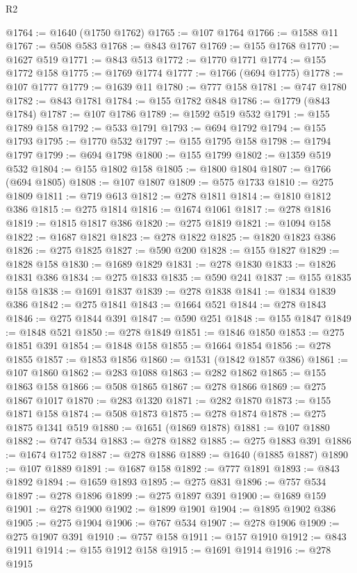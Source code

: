 \begin{lexlean}{R2}
\begin{coremodule}
@1764 := @1640 (@1750 @1762)
@1765 := @107 @1764
@1766 := @1588 @11
@1767 := @508 @583
@1768 := @843 @1767
@1769 := @155 @1768
@1770 := @1627 @519
@1771 := @843 @513
@1772 := @1770 @1771
@1774 := @155 @1772 @158
@1775 := @1769 @1774
@1777 := @1766 (@694 @1775)
@1778 := @107 @1777
@1779 := @1639 @11
@1780 := @777 @158
@1781 := @747 @1780
@1782 := @843 @1781
@1784 := @155 @1782 @848
@1786 := @1779 (@843 @1784)
@1787 := @107 @1786
@1789 := @1592 @519 @532
@1791 := @155 @1789 @158
@1792 := @533 @1791
@1793 := @694 @1792
@1794 := @155 @1793
@1795 := @1770 @532
@1797 := @155 @1795 @158
@1798 := @1794 @1797
@1799 := @694 @1798
@1800 := @155 @1799
@1802 := @1359 @519 @532
@1804 := @155 @1802 @158
@1805 := @1800 @1804
@1807 := @1766 (@694 @1805)
@1808 := @107 @1807
@1809 := @575 @1733
@1810 := @275 @1809
@1811 := @719 @613
@1812 := @278 @1811
@1814 := @1810 @1812 @386
@1815 := @275 @1814
@1816 := @1674 @1061
@1817 := @278 @1816
@1819 := @1815 @1817 @386
@1820 := @275 @1819
@1821 := @1094 @158
@1822 := @1687 @1821
@1823 := @278 @1822
@1825 := @1820 @1823 @386
@1826 := @275 @1825
@1827 := @590 @200
@1828 := @155 @1827
@1829 := @1828 @158
@1830 := @1689 @1829
@1831 := @278 @1830
@1833 := @1826 @1831 @386
@1834 := @275 @1833
@1835 := @590 @241
@1837 := @155 @1835 @158
@1838 := @1691 @1837
@1839 := @278 @1838
@1841 := @1834 @1839 @386
@1842 := @275 @1841
@1843 := @1664 @521
@1844 := @278 @1843
@1846 := @275 @1844 @391
@1847 := @590 @251
@1848 := @155 @1847
@1849 := @1848 @521
@1850 := @278 @1849
@1851 := @1846 @1850
@1853 := @275 @1851 @391
@1854 := @1848 @158
@1855 := @1664 @1854
@1856 := @278 @1855
@1857 := @1853 @1856
@1860 := @1531 (@1842 @1857 @386)
@1861 := @107 @1860
@1862 := @283 @1088
@1863 := @282 @1862
@1865 := @155 @1863 @158
@1866 := @508 @1865
@1867 := @278 @1866
@1869 := @275 @1867 @1017
@1870 := @283 @1320
@1871 := @282 @1870
@1873 := @155 @1871 @158
@1874 := @508 @1873
@1875 := @278 @1874
@1878 := @275 @1875 @1341 @519
@1880 := @1651 (@1869 @1878)
@1881 := @107 @1880
@1882 := @747 @534
@1883 := @278 @1882
@1885 := @275 @1883 @391
@1886 := @1674 @1752
@1887 := @278 @1886
@1889 := @1640 (@1885 @1887)
@1890 := @107 @1889
@1891 := @1687 @158
@1892 := @777 @1891
@1893 := @843 @1892
@1894 := @1659 @1893
@1895 := @275 @831
@1896 := @757 @534
@1897 := @278 @1896
@1899 := @275 @1897 @391
@1900 := @1689 @159
@1901 := @278 @1900
@1902 := @1899 @1901
@1904 := @1895 @1902 @386
@1905 := @275 @1904
@1906 := @767 @534
@1907 := @278 @1906
@1909 := @275 @1907 @391
@1910 := @757 @158
@1911 := @157 @1910
@1912 := @843 @1911
@1914 := @155 @1912 @158
@1915 := @1691 @1914
@1916 := @278 @1915

\end{coremodule}
\end{lexlean}
